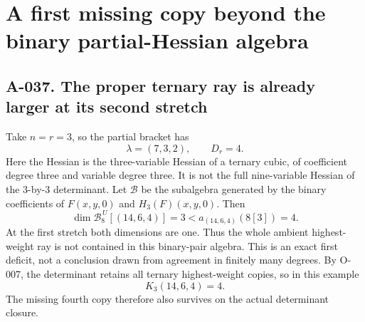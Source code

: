 \section{A first missing copy beyond the binary partial-Hessian algebra}

\subsection*{A-037. The proper ternary ray is already larger at its second stretch}
Take \(n=r=3\), so the partial bracket has
\[
                    \lambda=(7,3,2),\qquad D_r=4.
\]
Here the Hessian is the three-variable Hessian of a
ternary cubic, of coefficient degree three and
variable degree three. It is not the full
nine-variable Hessian of the \(3\)-by-\(3\) determinant.
Let \(\mathcal B\) be the subalgebra generated by the
binary coefficients of \(F(x,y,0)\) and
\(H_3(F)(x,y,0)\). Then
\[
 \boxed{\quad
 \dim\mathcal B_{8}^{\,U}[(14,6,4)]=3
       <a_{(14,6,4)}(8[3])=4.
 \quad}                                                        \tag{A-037.1}
\]
At the first stretch both dimensions are one.
Thus the whole ambient highest-weight ray is not
contained in this binary-pair algebra. This is an
exact first deficit, not a conclusion drawn from
agreement in finitely many degrees.
By O-007, the determinant retains all ternary
highest-weight copies, so in this example
\[
                         K_3(14,6,4)=4.                       \tag{A-037.2}
\]
The missing fourth copy therefore also survives
on the actual determinant closure.

